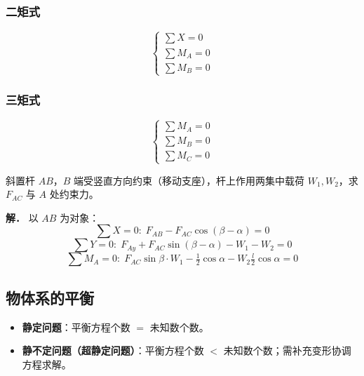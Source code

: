 \subsubsection{二矩式}
\begin{equation}
\begin{cases}\sum X=0\\ \sum M_A=0\\ \sum M_B=0\end{cases}
\label{eq:2-平衡-二矩}
\end{equation}

\subsubsection{三矩式}
\begin{equation}
\begin{cases}\sum M_A=0\\ \sum M_B=0\\ \sum M_C=0\end{cases}
\label{eq:2-平衡-三矩}
\end{equation}

\begin{example}[求 $F_{AC}$ 与 $A$ 处约束力]
斜置杆 $AB$，$B$ 端受竖直方向约束（移动支座），杆上作用两集中载荷 $W_1,W_2$，求 $F_{AC}$ 与 $A$ 处约束力。

\textbf{解．} 以 $AB$ 为对象：
\begin{equation}
\sum X=0:\;F_{AB}-F_{AC}\cos(\beta-\alpha)=0
\label{eq:2-例-AB-X}
\end{equation}
\begin{equation}
\sum Y=0:\;F_{Ay}+F_{AC}\sin(\beta-\alpha)-W_1-W_2=0
\label{eq:2-例-AB-Y}
\end{equation}
\begin{equation}
\sum M_A=0:\;F_{AC}\sin\beta\cdot W_1-\tfrac12\cos\alpha-W_2\tfrac{l}{2}\cos\alpha=0
\label{eq:2-例-AB-MA}
\end{equation}
\end{example}

\subsection{物体系的平衡}

\begin{itemize}
\item \textbf{静定问题}：平衡方程个数 $=$ 未知数个数。
\item \textbf{静不定问题（超静定问题）}：平衡方程个数 $<$ 未知数个数；需补充变形协调方程求解。
\end{itemize}


